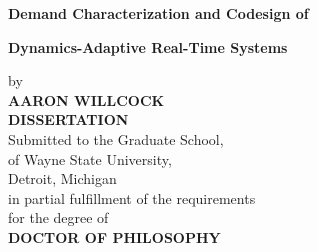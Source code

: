 \centerline{\bf Demand Characterization and Codesign of }
\vspace{-0.4cm}
\centerline{\bf Dynamics-Adaptive Real-Time Systems}

\vskip-0.4cm

\thispagestyle{empty}

\begin{center}
    \vspace{-0.4cm}
    by \\
    {\bf AARON WILLCOCK}\\ %
    {\bf DISSERTATION}\\  %
    Submitted to the Graduate School,\\
    of Wayne State University,\\
    Detroit, Michigan\\
    in partial fulfillment of the requirements\\
    for the degree of\\
    {\bf DOCTOR OF PHILOSOPHY} %
\end{center}

